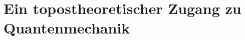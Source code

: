 \documentclass[a4paper,ngerman,12pt]{scrartcl}
\theoremstyle{definition}
\theoremstyle{plain}
\newtheorem{satz}[defn]{Satz}
\theoremstyle{remark}
\newcommand{\lhra}{\ensuremath{\lhook\joinrel\relbar\joinrel\rightarrow}}
\newcommand{\pp}{\mathfrak{p}}
\DeclareMathOperator{\Quot}{Quot}
\newcommand{\seq}[1]{\mathrel{\vdash\!\!\!_{#1}}}
\renewcommand{\_}{\mathpunct{.}\,}
\newcommand{\?}{\,{:}\,}
\begin{document}

\section{Ein topostheoretischer Zugang zu Quantenmechanik}
\end{document}
